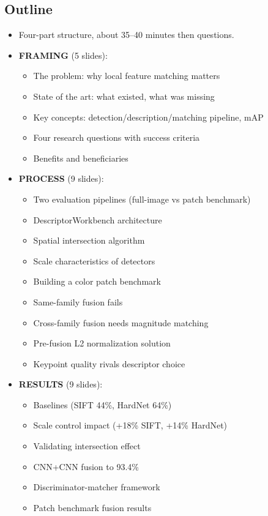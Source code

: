 \documentclass[11pt, letterpaper]{article}
\begin{document}
\subsection{Outline}
\begin{itemize}
  \item Four-part structure, about 35--40 minutes then questions.
  \item \textbf{FRAMING} (5 slides):
    \begin{itemize}
      \item The problem: why local feature matching matters
      \item State of the art: what existed, what was missing
      \item Key concepts: detection/description/matching pipeline, mAP
      \item Four research questions with success criteria
      \item Benefits and beneficiaries
    \end{itemize}
  \item \textbf{PROCESS} (9 slides):
    \begin{itemize}
      \item Two evaluation pipelines (full-image vs patch benchmark)
      \item DescriptorWorkbench architecture
      \item Spatial intersection algorithm
      \item Scale characteristics of detectors
      \item Building a color patch benchmark
      \item Same-family fusion fails
      \item Cross-family fusion needs magnitude matching
      \item Pre-fusion L2 normalization solution
      \item Keypoint quality rivals descriptor choice
    \end{itemize}
  \item \textbf{RESULTS} (9 slides):
    \begin{itemize}
      \item Baselines (SIFT 44\%, HardNet 64\%)
      \item Scale control impact (+18\% SIFT, +14\% HardNet)
      \item Validating intersection effect
      \item CNN+CNN fusion to 93.4\%
      \item Discriminator-matcher framework
      \item Patch benchmark fusion results

\end{itemize}
\end{itemize}
\end{document}
